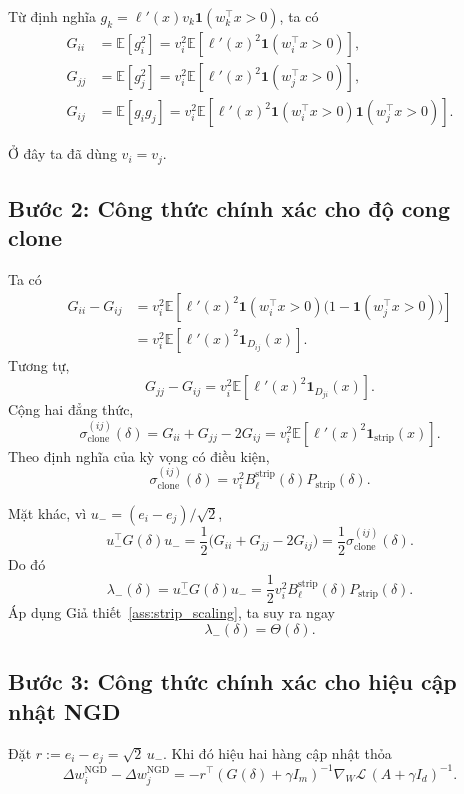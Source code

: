 \documentclass[11pt,a4paper]{article}
\newcommand{\E}{\mathbb{E}}
\newcommand{\cL}{\mathcal L}
\begin{document}
Từ định nghĩa $g_k = \ell'(x) v_k \mathbf 1(w_k^\top x > 0)$, ta có
\begin{align}
G_{ii}
&=
\E[g_i^2]
=
v_i^2 \E\!\left[\ell'(x)^2 \mathbf 1(w_i^\top x > 0)\right], \\
G_{jj}
&=
\E[g_j^2]
=
v_i^2 \E\!\left[\ell'(x)^2 \mathbf 1(w_j^\top x > 0)\right], \\
G_{ij}
&=
\E[g_i g_j]
=
v_i^2 \E\!\left[\ell'(x)^2 \mathbf 1(w_i^\top x > 0)\mathbf 1(w_j^\top x > 0)\right].
\end{align}

Ở đây ta đã dùng $v_i=v_j$.

\subsection*{Bước 2: Công thức chính xác cho độ cong clone}

Ta có
\begin{align}
G_{ii} - G_{ij}
&=
v_i^2 \E\!\left[\ell'(x)^2 \mathbf 1(w_i^\top x > 0)\bigl(1-\mathbf 1(w_j^\top x > 0)\bigr)\right] \\
&=
v_i^2 \E\!\left[\ell'(x)^2 \mathbf 1_{D_{ij}}(x)\right].
\end{align}
Tương tự,
\[
G_{jj} - G_{ij}
=
v_i^2 \E\!\left[\ell'(x)^2 \mathbf 1_{D_{ji}}(x)\right].
\]
Cộng hai đẳng thức,
\[
\sigma_{\mathrm{clone}}^{(ij)}(\delta)
=
G_{ii}+G_{jj}-2G_{ij}
=
v_i^2 \E\!\left[\ell'(x)^2 \mathbf 1_{\mathrm{strip}}(x)\right].
\]
Theo định nghĩa của kỳ vọng có điều kiện,
\[
\sigma_{\mathrm{clone}}^{(ij)}(\delta)
=
v_i^2 B_\ell^{\mathrm{strip}}(\delta) P_{\mathrm{strip}}(\delta).
\]

Mặt khác, vì $u_-=(e_i-e_j)/\sqrt 2$,
\[
u_-^\top G(\delta) u_-
=
\frac{1}{2}\bigl(G_{ii}+G_{jj}-2G_{ij}\bigr)
=
\frac{1}{2}\sigma_{\mathrm{clone}}^{(ij)}(\delta).
\]
Do đó
\[
\lambda_-(\delta)
=
u_-^\top G(\delta) u_-
=
\frac{1}{2} v_i^2 B_\ell^{\mathrm{strip}}(\delta) P_{\mathrm{strip}}(\delta).
\]
Áp dụng Giả thiết~\ref{ass:strip_scaling}, ta suy ra ngay
\[
\lambda_-(\delta) = \Theta(\delta).
\]

\subsection*{Bước 3: Công thức chính xác cho hiệu cập nhật NGD}

Đặt $r := e_i-e_j = \sqrt 2\,u_-$. Khi đó hiệu hai hàng cập nhật thỏa
\[
\Delta w_i^{\mathrm{NGD}} - \Delta w_j^{\mathrm{NGD}}
=
-r^\top (G(\delta)+\gamma I_m)^{-1} \nabla_W \cL\,(A+\gamma I_d)^{-1}.
\]
\end{document}
